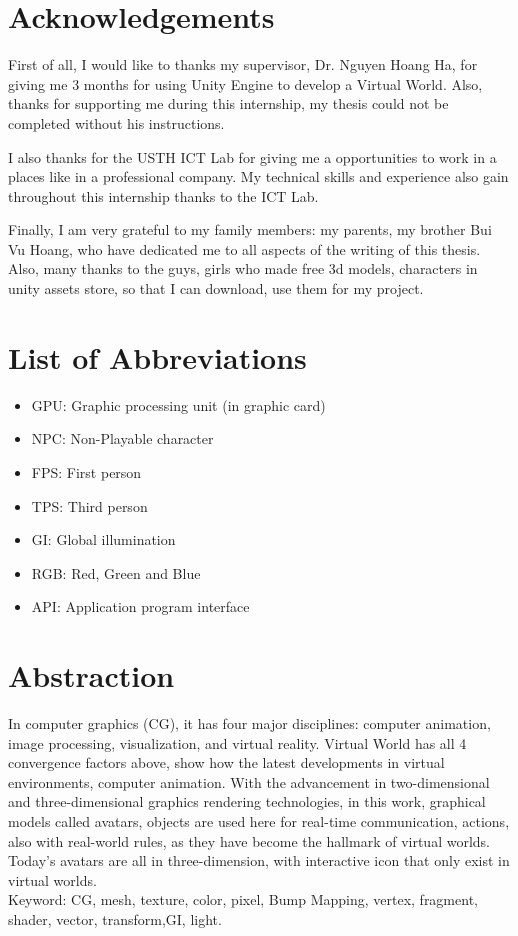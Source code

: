 \documentclass[a4paper, 13pt]{extarticle}
\begin{document}
\newpage
\setcounter{secnumdepth}{4}
\setcounter{tocdepth}{4}
\tableofcontents
\setcounter{page}{2}
\newpage

\newpage
\section*{\color{cyan}\Large Acknowledgements}

First of all, I would like to thanks my supervisor, Dr. Nguyen Hoang Ha, for giving me 3 months for using  Unity Engine to develop a Virtual World. Also, thanks for supporting me during this internship, my thesis could not be completed without his instructions. 

I also thanks for the USTH ICT Lab for giving me a opportunities to work in a places like in a professional company. My technical skills and experience also gain throughout this internship thanks to the ICT Lab.

Finally, I am very grateful to my family members: my parents, my brother Bui Vu Hoang, who have dedicated me to all aspects of the writing of this thesis. Also, many thanks to the guys, girls who made free 3d models, characters in unity assets store, so that I can download, use them for my project. 
\newpage
 
 \newpage
 \appendix
  \renewcommand{\thesubsection}{\Alph{section}}
 \renewcommand{\thesubsection}{\arabic{subsection}}
\section*{\Large List of Abbreviations} 
\begin{itemize}
	\item GPU: Graphic processing unit (in graphic card)
	\item NPC: Non-Playable character
	\item FPS: First person
	\item TPS: Third person
	\item GI: Global illumination	
	\item RGB: Red, Green and Blue
	\item API: Application program interface 
\end{itemize}
\newpage
\section{\Large Abstraction}
 In computer graphics (CG), it has four major disciplines: computer animation, image processing, visualization, and virtual reality. Virtual World has all 4 convergence factors above, show how the latest developments in virtual environments, computer animation. With the advancement in two-dimensional and three-dimensional graphics rendering technologies, in this work, graphical models called avatars, objects are used here for real-time communication, actions, also with real-world rules, as they have become the hallmark of virtual worlds. Today's avatars	are all in three-dimension, with interactive icon that only exist in virtual worlds. \\
 Keyword: CG, mesh, texture, color, pixel, Bump Mapping, vertex, fragment, shader, vector, transform,GI, light.
 
\end{document}
